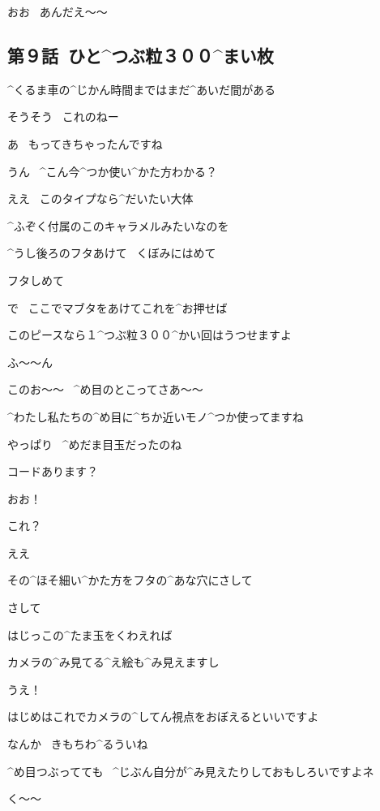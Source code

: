 \Ojisan おお
\ あんだえ〜〜


\subsection{第９話\ ひと^{つぶ}{粒}３００^{まい}{枚}}

\page[20]
\Alpha ^{くるま}{車}の^{じかん}{時間}まではまだ^{あいだ}{間}がある

\page[21]
\Alpha そうそう
\ これのねー

\Kokone あ
\ もってきちゃったんですね

\Alpha うん
\ ^{こん}{今}^{つか}{使}い^{かた}{方}わかる？

\Kokone ええ
\ このタイプなら^{だいたい}{大体}

\page[22]
\Kokone ^{ふぞく}{付属}のこのキャラメルみたいなのを

\Kokone ^{うし}{後}ろのフタあけて
\ くぼみにはめて

\Kokone フタしめて

\Kokone で
\ ここでマブタをあけてこれを^{お}{押}せば

\Kokone このピースなら１^{つぶ}{粒}３００^{かい}{回}はうつせますよ

\Alpha ふ〜〜ん

\page[23]
\Alpha このお〜〜
\ ^{め}{目}のとこってさあ〜〜

\Kokone ^{わたし}{私}たちの^{め}{目}に^{ちか}{近}いモノ^{つか}{使}ってますね

\Alpha やっぱり
\ ^{めだま}{目玉}だったのね

\page[24]
\Kokone コードあります？

\Alpha おお！

\Alpha これ？

\Kokone ええ

\Kokone その^{ほそ}{細}い^{かた}{方}をフタの^{あな}{穴}にさして

\Alpha さして

\Kokone はじっこの^{たま}{玉}をくわえれば

\page[25]
\Kokone カメラの^{み}{見}てる^{え}{絵}も^{み}{見}えますし

\Alpha うえ！

\Kokone はじめはこれでカメラの^{してん}{視点}をおぼえるといいですよ

\Alpha なんか
\ きもちわ^{る}{う}いね

\Kokone ^{め}{目}つぶってても
\ ^{じぶん}{自分}が^{み}{見}えたりしておもしろいですよネ

\Alpha く〜〜

